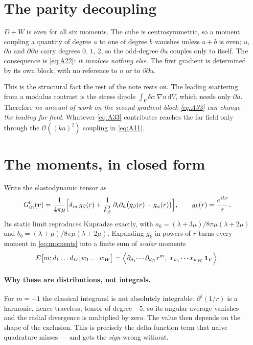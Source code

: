 \documentclass[11pt,a4paper]{article}
\newcommand{\order}{\mathcal{O}}
\newcommand{\dd}{\mathrm{d}}
\newcommand{\Gz}{G^{0}}
\begin{document}
\section{The parity decoupling}

$D+W$ is even for all six moments. The cube is centrosymmetric, so a moment
coupling a quantity of degree $a$ to one of degree $b$ vanishes unless $a+b$ is
even; $u$, $\partial u$ and $\partial\partial u$ carry degrees $0$, $1$, $2$, so
the odd-degree $\partial u$ couples only to itself. The consequence is
\eqref{eq:A22}: \emph{it involves nothing else}. The first gradient is
determined by its own block, with no reference to $u$ or to
$\partial\partial u$.

This is the structural fact the rest of the note rests on. The leading
scattering from a modulus contrast is the stress dipole
$\int_V \delta c:\nabla u\,\dd V$, which needs only $\partial u$. Therefore
\emph{no amount of work on the second-gradient block
\eqref{eq:A33} can change the leading far field}. Whatever \eqref{eq:A33}
contributes reaches the far field only through the $\order((ka)^2)$ coupling
in \eqref{eq:A11}.

\section{The moments, in closed form}

Write the elastodynamic tensor as
\begin{equation}
\Gz_{in}(\bm r)=\frac{1}{4\pi\mu}\Bigl[\delta_{in}\,g_\beta(r)
+\frac{1}{k_\beta^2}\,\partial_i\partial_n\bigl(g_\beta(r)-g_\alpha(r)\bigr)\Bigr],
\qquad g_k(r)=\frac{e^{ikr}}{r}.
\label{eq:Gdecomp}
\end{equation}
Its static limit reproduces Kupradze exactly, with
$a_0=(\lambda+3\mu)/8\pi\mu(\lambda+2\mu)$ and
$b_0=(\lambda+\mu)/8\pi\mu(\lambda+2\mu)$. Expanding $g_k$ in powers of $r$
turns every moment in \eqref{eq:moments} into a finite sum of \emph{scalar}
moments
\begin{equation}
E\bigl[m;d_1\ldots d_D;w_1\ldots w_W\bigr]
 =\Bigl\langle \partial_{d_1}\!\cdots\partial_{d_D} r^m,\;
   x_{w_1}\!\cdots x_{w_W}\,\mathbf{1}_V\Bigr\rangle .
\label{eq:E}
\end{equation}

\paragraph{Why these are distributions, not integrals.} For $m=-1$ the
classical integrand is not absolutely integrable: $\partial^4(1/r)$ is a
harmonic, hence traceless, tensor of degree $-5$, so its angular average
vanishes and the radial divergence is multiplied by zero. The value then
depends on the shape of the exclusion. This is precisely the delta-function
term that naive quadrature misses --- and gets the \emph{sign} wrong without.
\end{document}
